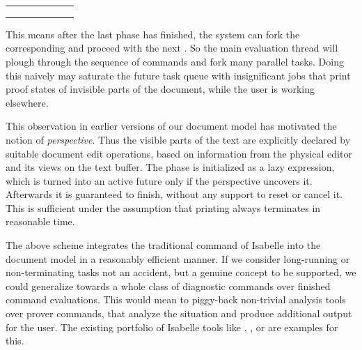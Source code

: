 \begin{isabellebody}
\begin{isamarkuptext}
  \medskip
  \begin{tabular}{lllllll}
  \isa{{\isasymdown}\isactrlsup r\isactrlsup e\isactrlsup a\isactrlsup d} &                & \isa{{\isasymdown}\isactrlsup r\isactrlsup e\isactrlsup a\isactrlsup d}   & & \isa{{\isasymdots}} \\
  \isa{st}  & \isa{{\isasymlongrightarrow}\isactrlsup e\isactrlsup v\isactrlsup a\isactrlisup l} & \isa{st{\isacharprime}}  & \isa{{\isasymlongrightarrow}\isactrlsup e\isactrlsup v\isactrlsup a\isactrlsup l} & \isa{st{\isacharprime}{\isacharprime}} & \isa{{\isasymdots}} \\
                &                 & \isa{{\isasymdown}\isactrlsup p\isactrlsup r\isactrlsup i\isactrlsup n\isactrlisup t} &               & \isa{{\isasymdown}\isactrlsup p\isactrlsup r\isactrlsup i\isactrlsup n\isactrlisup t} & & \isa{{\isasymdots}} \\
  \end{tabular}
  \medskip

  This means after the last  phase has finished, the
  system can fork the corresponding  and proceed with the
  next .  So the main evaluation thread will plough
  through the sequence of commands and fork many parallel  tasks.  Doing this naively may saturate the future task queue
  with insignificant jobs that print proof states of invisible parts
  of the document, while the user is working elsewhere.

  This observation in earlier versions of our document model has
  motivated the notion of \emph{perspective}.  Thus the visible parts
  of the text are explicitly declared by suitable document edit
  operations, based on information from the physical editor and its
  views on the text buffer.  The  phase is initialized as
  a lazy expression, which is turned into an active future only if the
  perspective uncovers it.  Afterwards it is guaranteed to finish,
  without any support to reset or cancel it.  This is sufficient under
  the assumption that printing always terminates in reasonable time.

  \medskip The above scheme integrates the traditional \isa{{\isasymPR}}
  command of Isabelle into the document model in a reasonably
  efficient manner.  If we consider long-running or non-terminating
   tasks not an accident, but a genuine concept to be
  supported, we could generalize \isa{{\isasymPR}} towards a whole class
  of diagnostic commands over finished command evaluations.  This
  would mean to piggy-back non-trivial analysis tools over prover
  commands, that analyze the situation and produce additional output
  for the user.  The existing portfolio of Isabelle tools like \isa{{\isasymNITPICK}}, \isa{{\isasymQUICKCHECK}}, or \isa{{\isasymSLEDGEHAMMER}}
  are examples for this.


\end{isamarkuptext}
\end{isabellebody}
